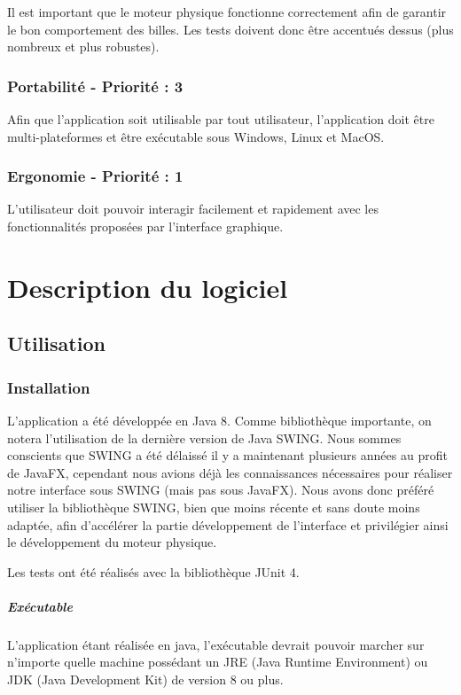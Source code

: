 \documentclass{report}
\begin{document}
Il est important que le moteur physique fonctionne correctement afin de garantir le bon comportement des billes. Les tests doivent donc être accentués dessus (plus nombreux et plus robustes).

\subsection{Portabilité - Priorité : 3}

Afin que l'application soit utilisable par tout utilisateur, l’application doit être multi-plateformes et être exécutable sous Windows, Linux et MacOS.

\subsection{Ergonomie - Priorité : 1}

L’utilisateur doit pouvoir interagir facilement et rapidement avec les fonctionnalités proposées par l’interface graphique.



\chapter{Description du logiciel}

\section{Utilisation}

\subsection{Installation}

L'application a été développée en Java 8. Comme bibliothèque importante, on notera l'utilisation de la dernière version de Java SWING. Nous sommes conscients que SWING a été délaissé il y a maintenant plusieurs années au profit de JavaFX, cependant nous avions déjà les connaissances nécessaires pour réaliser notre interface sous SWING (mais pas sous JavaFX). Nous avons donc préféré utiliser la bibliothèque SWING, bien que moins récente et sans doute moins adaptée, afin d'accélérer la partie développement de l'interface et privilégier ainsi le développement du moteur physique.

Les tests ont été réalisés avec la bibliothèque JUnit 4.

\paragraph*{Exécutable} L'application étant réalisée en java, l'exécutable devrait pouvoir marcher sur n'importe quelle machine possédant un JRE (Java Runtime Environment) ou JDK (Java Development Kit) de version 8 ou plus.
\end{document}
